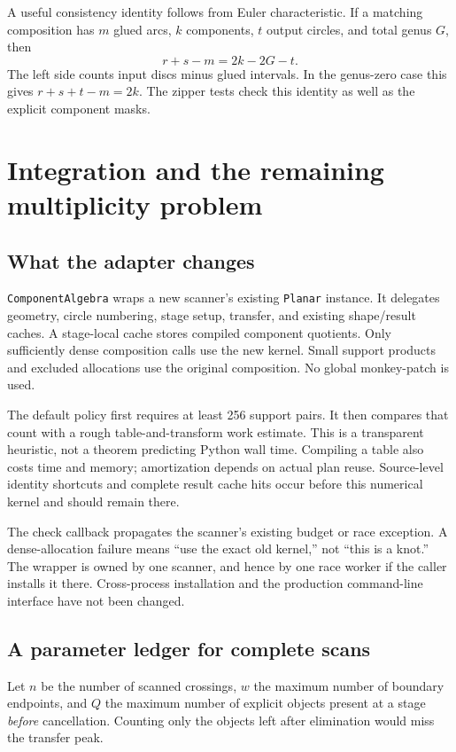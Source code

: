 \documentclass[11pt,letterpaper]{article}
\theoremstyle{definition}
\theoremstyle{remark}
\begin{document}
A useful consistency identity follows from Euler characteristic. If a
matching composition has $m$ glued arcs, $k$ components, $t$ output
circles, and total genus $G$, then
\begin{equation}
 r+s-m=2k-2G-t.
 \label{eq:euler}
\end{equation}
The left side counts input discs minus glued intervals. In the genus-zero
case this gives $r+s+t-m=2k$. The zipper tests check this identity as well
as the explicit component masks.

\section{Integration and the remaining multiplicity problem}
\label{sec:integration}
\subsection{What the adapter changes}
\texttt{ComponentAlgebra} wraps a new scanner's existing \texttt{Planar}
instance. It delegates geometry, circle numbering, stage setup, transfer,
and existing shape/result caches. A stage-local cache stores compiled
component quotients. Only sufficiently dense composition calls use the
new kernel. Small support products and excluded allocations use the
original composition. No global monkey-patch is used.

The default policy first requires at least 256 support pairs. It then
compares that count with a rough table-and-transform work estimate. This
is a transparent heuristic, not a theorem predicting Python wall time.
Compiling a table also costs time and memory; amortization depends on
actual plan reuse. Source-level identity shortcuts and complete result
cache hits occur before this numerical kernel and should remain there.

The check callback propagates the scanner's existing budget or race
exception. A dense-allocation failure means ``use the exact old kernel,''
not ``this is a knot.'' The wrapper is owned by one scanner, and hence by
one race worker if the caller installs it there. Cross-process installation
and the production command-line interface have not been changed.

\subsection{A parameter ledger for complete scans}
Let $n$ be the number of scanned crossings, $w$ the maximum number of
boundary endpoints, and $Q$ the maximum number of explicit objects present
at a stage \emph{before} cancellation. Counting only the objects left after
elimination would miss the transfer peak.
\end{document}
